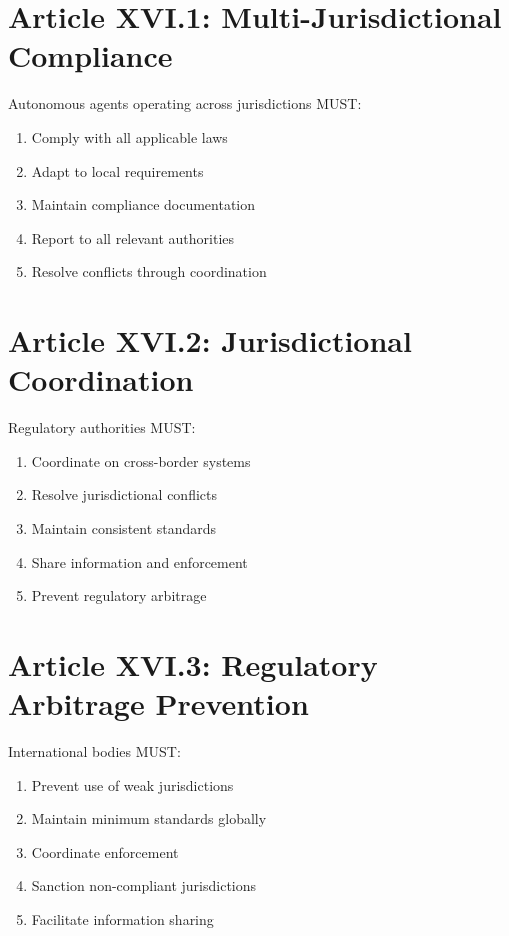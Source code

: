 \section{Article XVI.1: Multi-Jurisdictional Compliance}

\begin{articlebox}
Autonomous agents operating across jurisdictions MUST:
\begin{enumerate}
    \item Comply with all applicable laws
    \item Adapt to local requirements
    \item Maintain compliance documentation
    \item Report to all relevant authorities
    \item Resolve conflicts through coordination
\end{enumerate}
\end{articlebox}

\vspace{0.5cm}

\section{Article XVI.2: Jurisdictional Coordination}

\begin{articlebox}
Regulatory authorities MUST:
\begin{enumerate}
    \item Coordinate on cross-border systems
    \item Resolve jurisdictional conflicts
    \item Maintain consistent standards
    \item Share information and enforcement
    \item Prevent regulatory arbitrage
\end{enumerate}
\end{articlebox}

\vspace{0.5cm}

\section{Article XVI.3: Regulatory Arbitrage Prevention}

\begin{articlebox}
International bodies MUST:
\begin{enumerate}
    \item Prevent use of weak jurisdictions
    \item Maintain minimum standards globally
    \item Coordinate enforcement
    \item Sanction non-compliant jurisdictions
    \item Facilitate information sharing
\end{enumerate}
\end{articlebox}


